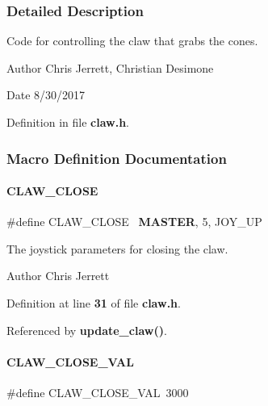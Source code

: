 \subsubsection{Detailed Description}
Code for controlling the claw that grabs the cones. 

\begin{DoxyAuthor}{Author}
Chris Jerrett, Christian Desimone 
\end{DoxyAuthor}
\begin{DoxyDate}{Date}
8/30/2017 
\end{DoxyDate}


Definition in file \textbf{ claw.\+h}.



\subsubsection{Macro Definition Documentation}
\mbox{\label{a00008_af2a18397e9efae0be9470a76797b2077}} 
\paragraph{C\+L\+A\+W\+\_\+\+C\+L\+O\+SE}
{\footnotesize\ttfamily \#define C\+L\+A\+W\+\_\+\+C\+L\+O\+SE~\textbf{ M\+A\+S\+T\+ER}, 5, J\+O\+Y\+\_\+\+UP}



The joystick parameters for closing the claw. 

\begin{DoxyAuthor}{Author}
Chris Jerrett 
\end{DoxyAuthor}


Definition at line \textbf{ 31} of file \textbf{ claw.\+h}.



Referenced by \textbf{ update\+\_\+claw()}.

\mbox{\label{a00008_a78d3e6f3d4b60e1be137fdc6dd144224}} 
\paragraph{C\+L\+A\+W\+\_\+\+C\+L\+O\+S\+E\+\_\+\+V\+AL}
{\footnotesize\ttfamily \#define C\+L\+A\+W\+\_\+\+C\+L\+O\+S\+E\+\_\+\+V\+AL~3000}



